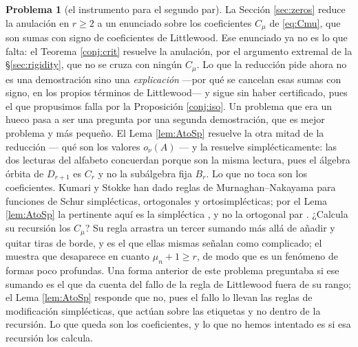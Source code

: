 \documentclass[11pt,reqno]{amsart}
\theoremstyle{plain}
\theoremstyle{definition}
\newtheorem{problem}[theorem]{Problema}
\begin{document}
\begin{problem}[el instrumento para el segundo par]\label{prob:instrument}
La Sección \ref{sec:zeros} reduce la anulación en $r\ge2$ a un enunciado sobre los coeficientes
$C_\mu$ de \eqref{eq:Cmu}, que son sumas con signo de coeficientes de Littlewood. Ese enunciado ya
no es lo que falta: el Teorema \ref{conj:crit} resuelve la anulación, por el argumento extremal de
la \S\ref{sec:rigidity}, que no se cruza con ningún $C_\mu$. Lo que la reducción pide ahora no es
una demostración sino una \emph{explicación} ---por qué se cancelan esas sumas con signo, en los
propios términos de Littlewood--- y sigue sin haber certificado, pues el que propusimos falla por la
Proposición \ref{conj:iso}. Un problema que era un hueco pasa a ser una pregunta por una segunda
demostración, que es mejor problema y más pequeño. El Lema \ref{lem:AtoSp} resuelve la otra mitad de la reducción --- qué
son los valores $o_\nu(A)$ --- y la resuelve simplécticamente: las dos lecturas del alfabeto
concuerdan porque son la misma lectura, pues el álgebra órbita de $D_{r+1}$ es $C_r$ y no la
subálgebra fija $B_r$. Lo que no toca son los coeficientes. Kumari y Stokke \cite{KS26} han dado
reglas de Murnaghan--Nakayama para funciones de Schur simplécticas, ortogonales y ortosimplécticas;
por el Lema \ref{lem:AtoSp} la pertinente aquí es la simpléctica \cite[Teorema 3.4]{KS26}, y no la
ortogonal par \cite[Teorema 3.10]{KS26}. ¿Calcula su recursión los
$C_\mu$? Su regla arrastra un tercer sumando más allá de añadir y quitar tiras de borde, y es el que
ellas mismas señalan como complicado; el \cite[Corolario 3.5]{KS26} muestra que desaparece en cuanto
$\mu_n+1\ge r$, de modo que es un fenómeno de formas poco profundas. Una forma anterior de este
problema preguntaba si ese sumando es el que da cuenta del fallo de la regla de Littlewood fuera de su
rango; el Lema \ref{lem:AtoSp} responde que no, pues el fallo lo llevan las reglas de modificación
simplécticas, que actúan sobre las etiquetas y no dentro de la recursión. Lo que queda son los
coeficientes, y lo que no hemos intentado es si esa recursión los calcula.


\end{problem}
\end{document}
